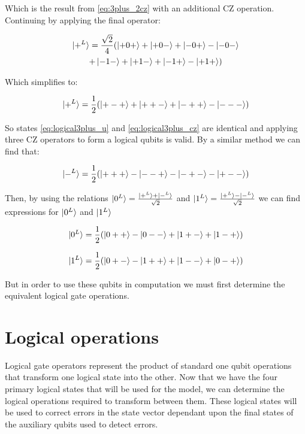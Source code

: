 Which is the result from \eqref{eq:3plus_2cz} with an additional CZ operation. Continuing by applying the final operator:

\begin{multline*}
\ket{+^{L}} = \frac{\sqrt{2}}{4}(\ket{+0+} + \ket{+0-} + \ket{-0+} - \ket{-0-} \\
 + \ket{-1-} + \ket{+1-} + \ket{-1+} - \ket{+1+}) \\
\end{multline*}

Which simplifies to:

\begin{equation}
\label{eq:logical3plus_cz}
\ket{+^{L}} = \frac{1}{2}(\ket{+-+} +\ket{++-} + \ket{-++} - \ket{---})
\end{equation}

So states \eqref{eq:logical3plus_u} and \eqref{eq:logical3plus_cz} are identical and applying three CZ operators to form a logical qubits is valid. By a similar method we can find that:  

\begin{equation}
\ket{-^{L}} = \frac{1}{2}(\ket{+++} - \ket{--+} - \ket{-+-} - \ket{+--})
\end{equation}

Then, by using the relations $\ket{0^{L}} = \frac{\ket{+^{L}} + \ket{-^{L}}}{\sqrt{2}}$ and $\ket{1^{L}} = \frac{\ket{+^{L}} - \ket{-^{L}}}{\sqrt{2}}$ we can find expressions for $\ket{0^{L}}$ and $\ket{1^{L}}$

\begin{equation}
\ket{0^{L}} = \frac{1}{2} (\ket{0++} - \ket{0--} + \ket{1+-} + \ket{1-+})
\end{equation}

\begin{equation}
\ket{1^{L}} = \frac{1}{2} (\ket{0+-} - \ket{1++} + \ket{1--} + \ket{0-+})
\end{equation}

But in order to use these qubits in computation we must first determine the equivalent logical gate operations.


\section{Logical operations}

Logical gate operators represent the product of standard one qubit operations that transform one logical state into the other. Now that we have the four primary logical states that will be used for the model, we can determine the logical operations required to transform between them. These logical states will be used to correct errors in the state vector dependant upon the final states of the auxiliary qubits used to detect errors.

